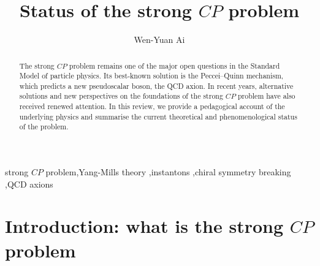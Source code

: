 \documentclass[review]{elsarticle}
\numberwithin{equation}{section}
\numberwithin{table}{section}
\numberwithin{figure}{section}
\begin{document}
\makeatletter
\def\ps@pprintTitle{%
   \let\@oddhead\@empty
   \let\@evenhead\@empty
   \let\@oddfoot\@empty
   \let\@evenfoot\@oddfoot}
\makeatother
    
\begin{frontmatter}
		
\title{Status of the strong $CP$ problem}

\author[address1,address2]{Wen-Yuan Ai}



		
\address[address1]{State Key Laboratory of Dark Matter Physics,\\ Tsung-Dao Lee Institute and School of Physics and Astronomy,\\ Shanghai Jiao Tong University, Shanghai 201210, China}
\address[address2]{Key Laboratory for Particle Astrophysics and Cosmology (MOE),\\ and Shanghai Key Laboratory for Particle Physics and Cosmology,\\ Shanghai Jiao Tong University, Shanghai 201210, China }
		
\begin{abstract}
The strong $CP$ problem remains one of the major open questions in the Standard Model of particle physics. Its best-known solution is the Peccei--Quinn mechanism, which predicts a new pseudoscalar boson, the QCD axion. In recent years, alternative solutions and new perspectives on the foundations of the strong $CP$ problem have also received renewed attention. In this review, we provide a pedagogical account of the underlying physics and summarise the current theoretical and phenomenological status of the problem.
\end{abstract}
		
\begin{keyword}
strong $CP$ problem\sep Yang-Mills theory \sep instantons  \sep chiral symmetry breaking  \sep QCD axions
\end{keyword}
\end{frontmatter}

\newpage
\thispagestyle{empty}
\tableofcontents
	
	
	
\newpage

\section{Introduction: what is the strong \texorpdfstring{$CP$}{CP} problem}
\end{document}
